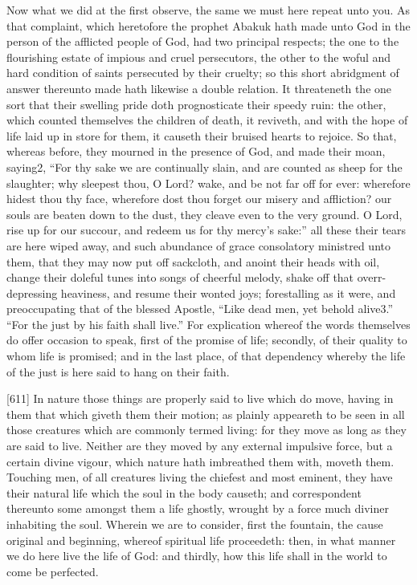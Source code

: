 Now what we did at the first observe, the same we must here repeat unto you. As that complaint, which heretofore the prophet Abakuk hath made unto God in the person of the afflicted people of God, had two principal respects; the one to the flourishing estate of impious and cruel persecutors, the other to the woful and hard condition of saints persecuted by their cruelty; so this short abridgment of answer thereunto made hath likewise a double relation. It threateneth the one sort that their swelling pride doth prognosticate their speedy ruin: the other, which counted themselves the children of death, it reviveth, and with the hope of life laid up in store for them, it causeth their bruised hearts to rejoice. So that, whereas before, they mourned in the presence of God, and made their moan, saying2, “For thy sake we are continually slain, and are counted as sheep for the slaughter; why sleepest thou, O Lord? wake, and be not far off for ever: wherefore hidest thou thy face, wherefore dost thou forget our misery and affliction? our souls are beaten down to the dust, they cleave even to the very ground. O Lord, rise up for our succour, and redeem us for thy mercy’s sake:” all these their tears are here wiped away, and such abundance of grace consolatory ministred unto them, that they may now put off sackcloth, and anoint their heads with oil, change their doleful tunes into songs of cheerful melody, shake off that overr-depressing heaviness, and resume their wonted joys; forestalling as it were, and preoccupating that of the blessed Apostle, “Like dead men, yet behold alive3.” “For the just by his faith shall live.” For explication whereof the words themselves do offer occasion to speak, first of the promise of life; secondly, of their quality to whom life is promised; and in the last place, of that dependency whereby the life of the just is here said to hang on their faith.

[611]
In nature those things are properly said to live which do move, having in them that which giveth them their motion; as plainly appeareth to be seen in all those creatures which are commonly termed living: for they move as long as they are said to live. Neither are they moved by any external impulsive force, but a certain divine vigour, which nature hath imbreathed them with, moveth them. Touching men, of all creatures living the chiefest and most eminent, they have their natural life which the soul in the body causeth; and correspondent thereunto some amongst them a life ghostly, wrought by a force much diviner inhabiting the soul. Wherein we are to consider, first the fountain, the cause original and beginning, whereof spiritual life proceedeth: then, in what manner we do here live the life of God: and thirdly, how this life shall in the world to come be perfected.

